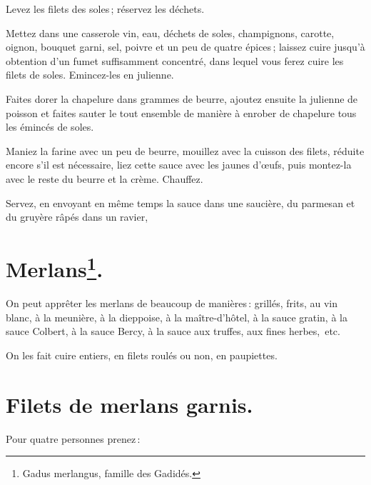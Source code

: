 Levez les filets des soles ; réservez les déchets.

Mettez dans une casserole vin, eau, déchets de soles, champignons, carotte,
oignon, bouquet garni, sel, poivre et un peu de quatre épices ; laissez cuire
jusqu'à obtention d'un fumet suffisamment concentré, dans lequel vous ferez
cuire les filets de soles. Emincez-les en julienne.

Faites dorer la chapelure dans {\mmm} grammes de beurre, ajoutez ensuite la
julienne de poisson et faites sauter le tout ensemble de manière à enrober de
chapelure tous les émincés de soles.

Maniez la farine avec un peu de beurre, mouillez avec la cuisson des filets,
réduite encore s'il est nécessaire, liez cette sauce avec les jaunes d'œufs,
puis montez-la avec le reste du beurre et la crème. Chauffez.

Servez, en envoyant en même temps la sauce dans une saucière, du parmesan
et du gruyère râpés dans un ravier,

\section*{\centering Merlans\footnote{Gadus merlangus, famille des Gadidés.}.}

On peut apprêter les merlans de beaucoup de manières : grillés, frits, au vin
blanc, à la meunière, à la dieppoise, à la maître-d'hôtel, à la sauce gratin,
à la sauce Colbert, à la sauce Bercy, à la sauce aux truffes, aux fines herbes, etc.

On les fait cuire entiers, en filets roulés ou non, en paupiettes.

\section*{\centering Filets de merlans garnis.}

Pour quatre personnes prenez :

\medskip

